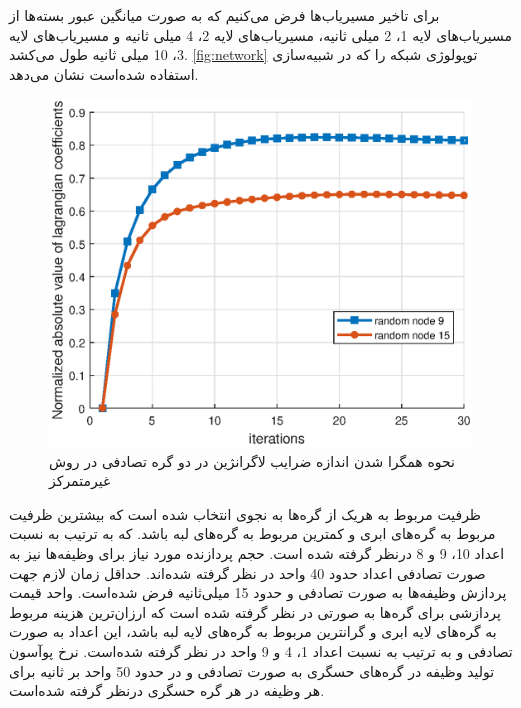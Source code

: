     برای تاخیر مسیریاب‌ها فرض می‌کنیم که به صورت میانگین عبور بسته‌ها از مسیریاب‌های لایه 1، 2 میلی ثانیه، مسیریاب‌های لایه 2، 4 میلی ثانیه و مسیریاب‌های لایه 3، 10 میلی ثانیه طول می‌کشد.
\cref{fig:network} توپولوژی شبکه را که در شبیه‌سازی استفاده شده‌است نشان می‌دهد.

\begin{figure}[h!]
	\centerline{\includegraphics[width=12cm]{graphics/3-cent-decent/decentralized_lagrangian_coeffs_convergence}}
	\caption{نحوه‌ همگرا شدن اندازه ضرایب لاگرانژین در دو گره تصادفی در روش غیرمتمرکز}
	\label{fig:decentralized_lagrangian_coeffs_convergence}
\end{figure}

ظرفیت مربوط به هریک از گره‌ها به نجوی انتخاب شده است که بیشترین ظرفیت مربوط به گره‌های ابری و کمترین مربوط به گره‌های لبه باشد. که به ترتیب به نسبت اعداد 10، 9 و 8 درنظر گرفته شده است. حجم پردازنده مورد نیاز برای وظیفه‌ها نیز به صورت تصادفی اعداد حدود 40 واحد در نظر گرفته شده‌اند. حداقل زمان لازم جهت پردازش وظیفه‌ها به صورت تصادفی و حدود 15 میلی‌ثانیه فرض شده‌است. واحد قیمت پردازشی برای گره‌ها به صورتی در نظر گرفته شده است که ارزان‌ترین هزینه مربوط به گره‌های لایه ابری و گرانترین مربوط به گره‌‌های لایه لبه باشد، این اعداد به صورت تصادفی و به ترتیب به نسبت اعداد 1، 4 و 9 واحد در نظر گرفته شده‌است. نرخ پوآسون تولید وظیفه در گره‌های حسگری به صورت تصادفی و در حدود 50 واحد بر ثانیه برای هر وظیفه در هر گره حسگری درنظر گرفته شده‌است. 

